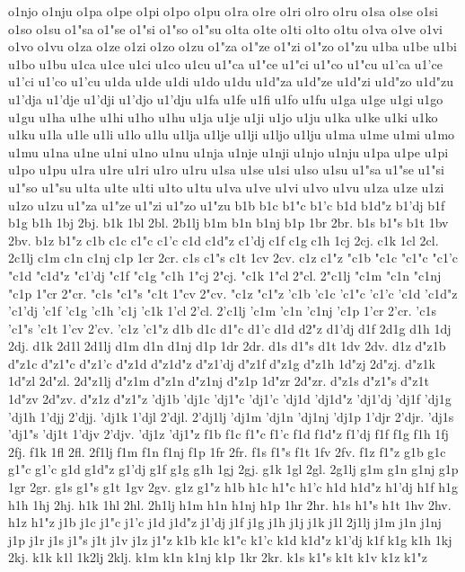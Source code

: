 o1njo
o1nju
o1pa
o1pe
o1pi
o1po
o1pu
o1ra
o1re
o1ri
o1ro
o1ru
o1sa
o1se
o1si
o1so
o1su
o1"sa
o1"se
o1"si
o1"so
o1"su
o1ta
o1te
o1ti
o1to
o1tu
o1va
o1ve
o1vi
o1vo
o1vu
o1za
o1ze
o1zi
o1zo
o1zu
o1"za
o1"ze
o1"zi
o1"zo
o1"zu
u1ba
u1be
u1bi
u1bo
u1bu
u1ca
u1ce
u1ci
u1co
u1cu
u1"ca
u1"ce
u1"ci
u1"co
u1"cu
u1'ca
u1'ce
u1'ci
u1'co
u1'cu
u1da
u1de
u1di
u1do
u1du
u1d"za
u1d"ze
u1d"zi
u1d"zo
u1d"zu
u1'dja
u1'dje
u1'dji
u1'djo
u1'dju
u1fa
u1fe
u1fi
u1fo
u1fu
u1ga
u1ge
u1gi
u1go
u1gu
u1ha
u1he
u1hi
u1ho
u1hu
u1ja
u1je
u1ji
u1jo
u1ju
u1ka
u1ke
u1ki
u1ko
u1ku
u1la
u1le
u1li
u1lo
u1lu
u1lja
u1lje
u1lji
u1ljo
u1lju
u1ma
u1me
u1mi
u1mo
u1mu
u1na
u1ne
u1ni
u1no
u1nu
u1nja
u1nje
u1nji
u1njo
u1nju
u1pa
u1pe
u1pi
u1po
u1pu
u1ra
u1re
u1ri
u1ro
u1ru
u1sa
u1se
u1si
u1so
u1su
u1"sa
u1"se
u1"si
u1"so
u1"su
u1ta
u1te
u1ti
u1to
u1tu
u1va
u1ve
u1vi
u1vo
u1vu
u1za
u1ze
u1zi
u1zo
u1zu
u1"za
u1"ze
u1"zi
u1"zo
u1"zu
b1b
b1c
b1"c
b1'c
b1d
b1d"z
b1'dj
b1f
b1g
b1h
1bj
2bj.
b1k
1bl
2bl.
2b1lj
b1m
b1n
b1nj
b1p
1br
2br.
b1s
b1"s
b1t
1bv
2bv.
b1z
b1"z
c1b
c1c
c1"c
c1'c
c1d
c1d"z
c1'dj
c1f
c1g
c1h
1cj
2cj.
c1k
1cl
2cl.
2c1lj
c1m
c1n
c1nj
c1p
1cr
2cr.
c1s
c1"s
c1t
1cv
2cv.
c1z
c1"z
"c1b
"c1c
"c1"c
"c1'c
"c1d
"c1d"z
"c1'dj
"c1f
"c1g
"c1h
1"cj
2"cj.
"c1k
1"cl
2"cl.
2"c1lj
"c1m
"c1n
"c1nj
"c1p
1"cr
2"cr.
"c1s
"c1"s
"c1t
1"cv
2"cv.
"c1z
"c1"z
'c1b
'c1c
'c1"c
'c1'c
'c1d
'c1d"z
'c1'dj
'c1f
'c1g
'c1h
'c1j
'c1k
1'cl
2'cl.
2'c1lj
'c1m
'c1n
'c1nj
'c1p
1'cr
2'cr.
'c1s
'c1"s
'c1t
1'cv
2'cv.
'c1z
'c1"z
d1b
d1c
d1"c
d1'c
d1d
d2"z
d1'dj
d1f
2d1g
d1h
1dj
2dj.
d1k
2d1l
2d1lj
d1m
d1n
d1nj
d1p
1dr
2dr.
d1s
d1"s
d1t
1dv
2dv.
d1z
d"z1b
d"z1c
d"z1"c
d"z1'c
d"z1d
d"z1d"z
d"z1'dj
d"z1f
d"z1g
d"z1h
1d"zj
2d"zj.
d"z1k
1d"zl
2d"zl.
2d"z1lj
d"z1m
d"z1n
d"z1nj
d"z1p
1d"zr
2d"zr.
d"z1s
d"z1"s
d"z1t
1d"zv
2d"zv.
d"z1z
d"z1"z
'dj1b
'dj1c
'dj1"c
'dj1'c
'dj1d
'dj1d"z
'dj1'dj
'dj1f
'dj1g
'dj1h
1'djj
2'djj.
'dj1k
1'djl
2'djl.
2'dj1lj
'dj1m
'dj1n
'dj1nj
'dj1p
1'djr
2'djr.
'dj1s
'dj1"s
'dj1t
1'djv
2'djv.
'dj1z
'dj1"z
f1b
f1c
f1"c
f1'c
f1d
f1d"z
f1'dj
f1f
f1g
f1h
1fj
2fj.
f1k
1fl
2fl.
2f1lj
f1m
f1n
f1nj
f1p
1fr
2fr.
f1s
f1"s
f1t
1fv
2fv.
f1z
f1"z
g1b
g1c
g1"c
g1'c
g1d
g1d"z
g1'dj
g1f
g1g
g1h
1gj
2gj.
g1k
1gl
2gl.
2g1lj
g1m
g1n
g1nj
g1p
1gr
2gr.
g1s
g1"s
g1t
1gv
2gv.
g1z
g1"z
h1b
h1c
h1"c
h1'c
h1d
h1d"z
h1'dj
h1f
h1g
h1h
1hj
2hj.
h1k
1hl
2hl.
2h1lj
h1m
h1n
h1nj
h1p
1hr
2hr.
h1s
h1"s
h1t
1hv
2hv.
h1z
h1"z
j1b
j1c
j1"c
j1'c
j1d
j1d"z
j1'dj
j1f
j1g
j1h
j1j
j1k
j1l
2j1lj
j1m
j1n
j1nj
j1p
j1r
j1s
j1"s
j1t
j1v
j1z
j1"z
k1b
k1c
k1"c
k1'c
k1d
k1d"z
k1'dj
k1f
k1g
k1h
1kj
2kj.
k1k
k1l
1k2lj
2klj.
k1m
k1n
k1nj
k1p
1kr
2kr.
k1s
k1"s
k1t
k1v
k1z
k1"z
